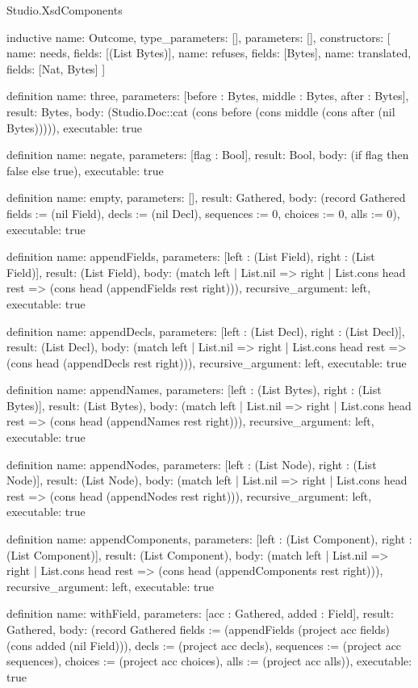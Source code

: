 \begin{lexlean}{Studio.XsdComponents}
\begin{semanticmodule}
inductive{
  name: Outcome,
  type_parameters: [],
  parameters: [],
  constructors: [
    {name: needs, fields: [(List Bytes)]},
    {name: refuses, fields: [Bytes]},
    {name: translated, fields: [Nat, Bytes]}
  ]
}

definition{
  name: three,
  parameters: [before : Bytes, middle : Bytes, after : Bytes],
  result: Bytes,
  body: (Studio.Doc::cat (cons before (cons middle (cons after (nil Bytes))))),
  executable: true
}

definition{
  name: negate,
  parameters: [flag : Bool],
  result: Bool,
  body: (if flag then false else true),
  executable: true
}

definition{
  name: empty,
  parameters: [],
  result: Gathered,
  body: (record Gathered {fields := (nil Field), decls := (nil Decl), sequences := 0, choices := 0, alls := 0}),
  executable: true
}

definition{
  name: appendFields,
  parameters: [left : (List Field), right : (List Field)],
  result: (List Field),
  body: (match left
    | List.nil => right
    | List.cons head rest => (cons head (appendFields rest right))),
  recursive_argument: left,
  executable: true
}

definition{
  name: appendDecls,
  parameters: [left : (List Decl), right : (List Decl)],
  result: (List Decl),
  body: (match left
    | List.nil => right
    | List.cons head rest => (cons head (appendDecls rest right))),
  recursive_argument: left,
  executable: true
}

definition{
  name: appendNames,
  parameters: [left : (List Bytes), right : (List Bytes)],
  result: (List Bytes),
  body: (match left
    | List.nil => right
    | List.cons head rest => (cons head (appendNames rest right))),
  recursive_argument: left,
  executable: true
}

definition{
  name: appendNodes,
  parameters: [left : (List Node), right : (List Node)],
  result: (List Node),
  body: (match left
    | List.nil => right
    | List.cons head rest => (cons head (appendNodes rest right))),
  recursive_argument: left,
  executable: true
}

definition{
  name: appendComponents,
  parameters: [left : (List Component), right : (List Component)],
  result: (List Component),
  body: (match left
    | List.nil => right
    | List.cons head rest => (cons head (appendComponents rest right))),
  recursive_argument: left,
  executable: true
}

definition{
  name: withField,
  parameters: [acc : Gathered, added : Field],
  result: Gathered,
  body: (record Gathered {fields := (appendFields (project acc fields) (cons added (nil Field))), decls := (project acc decls), sequences := (project acc sequences), choices := (project acc choices), alls := (project acc alls)}),
  executable: true
}


\end{semanticmodule}
\end{lexlean}
